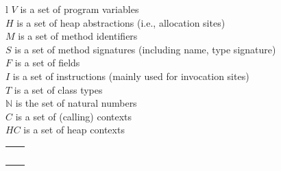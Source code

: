\begin{figure}[tb!p]
\hspace{-1mm}
\begin{tabular}{l}
\small $V$ is a set of program variables \\
\small $H$ is a set of heap abstractions (i.e., allocation sites) \\
\small $M$ is a set of method identifiers \\
\small $S$ is a set of method signatures (including name, type signature) \\
\small $F$ is a set of fields \\
\small $I$ is a set of instructions (mainly used for invocation sites)\\
\small $T$ is a set of class types \\
\small $\mathbb{N}$ is the set of natural numbers \\
\small $C$ is a set of (calling) contexts \\
\small $HC$ is a set of heap contexts \\
\hspace{-3mm}
\begin{tabular}{l l}
\pred{Alloc}{var : V, heap : H, inMeth : M}  & \args{\# var = new ...} \\
\pred{Move}{to : V, from : V}                & \args{\# to = from} \\
\pred{Load}{to : V, base : V, fld : F}       & \args{\# to = base.fld}\\
\pred{Store}{base : V, fld : F, from : V}    & \args{\# base.fld = from} \\
\pred{VCall}{base : V, sig : S, invo : I, inMeth : M} & \args{\# base.sig(..)}   \\

\end{tabular}
\end{tabular}
\end{figure}
